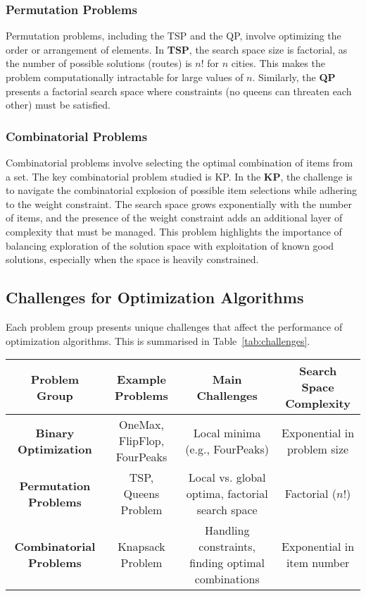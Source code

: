 \subsubsection{Permutation Problems}
Permutation problems, including the TSP and the QP, involve optimizing the order or arrangement of elements.
In \textbf{TSP}, the search space size is factorial, as the number of possible solutions (routes) is \(n!\) for \(n\) cities. This makes the problem computationally intractable for large values of \(n\). Similarly, the \textbf{QP} presents a factorial search space where constraints (no queens can threaten each other) must be satisfied.

\subsubsection{Combinatorial Problems}
Combinatorial problems involve selecting the optimal combination of items from a set. The key combinatorial problem studied is KP. In the \textbf{KP}, the challenge is to navigate the combinatorial explosion of possible item selections while adhering to the weight constraint. The search space grows exponentially with the number of items, and the presence of the weight constraint adds an additional layer of complexity that must be managed. This problem highlights the importance of balancing exploration of the solution space with exploitation of known good solutions, especially when the space is heavily constrained.

\subsection{Challenges for Optimization Algorithms}
Each problem group presents unique challenges that affect the performance of optimization algorithms. This is summarised in Table~\ref{tab:challenges}.
\begin{table*}[h!]
    \centering
    \caption{Summary of Challenges for Optimization Algorithms Across Problem Types}
    \begin{tabular}{|c|c|c|c|}
        \hline
        \textbf{Problem Group} & \textbf{Example Problems} & \textbf{Main Challenges} & \textbf{Search Space Complexity} \\ \hline
        \textbf{Binary Optimization} & OneMax, FlipFlop, FourPeaks & Local minima (e.g., FourPeaks) & Exponential in problem size \\ \hline
        \textbf{Permutation Problems} & TSP, Queens Problem & Local vs. global optima, factorial search space & Factorial (\(n!\)) \\ \hline
        \textbf{Combinatorial Problems} & Knapsack Problem & Handling constraints, finding optimal combinations & Exponential in item number \\ \hline
    \end{tabular}
    \label{tab:challenges}
\end{table*}
